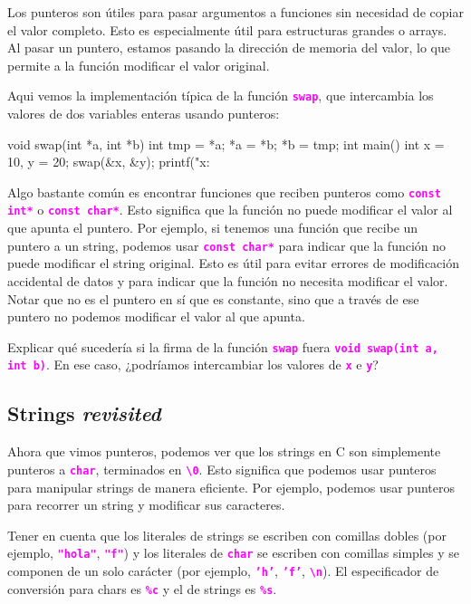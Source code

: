 \documentclass[]{scrartcl}
\newcommand{\hl}[1]{\textcolor{magenta}{\textbf{\texttt{#1}}}}
\begin{document}
Los punteros son útiles para pasar argumentos a funciones sin necesidad de copiar el valor completo. Esto es especialmente útil para estructuras grandes o arrays. Al pasar un puntero, estamos pasando la dirección de memoria del valor, lo que permite a la función modificar el valor original.

Aqui vemos la implementación típica de la función \hl{swap}, que intercambia los valores de dos variables enteras usando punteros:

\begin{cbox}[]{}

    void swap(int *a, int *b) {
        int tmp = *a;
        *a = *b;
        *b = tmp;
    }
    int main() {
        int x = 10, y = 20;
        swap(&x, &y);
        printf("x: %
    }
\end{cbox}

Algo bastante común es encontrar funciones que reciben punteros como \hl{const int*} o \hl{const char*}. Esto significa que la función no puede modificar el valor al que apunta el puntero. Por ejemplo, si tenemos una función que recibe un puntero a un string, podemos usar \hl{const char*} para indicar que la función no puede modificar el string original.
Esto es útil para evitar errores de modificación accidental de datos y para indicar que la función no necesita modificar el valor. Notar que no es el puntero en sí que es constante, sino que a través de ese puntero no podemos modificar el valor al que apunta. 

\begin{exbox}
Explicar qué sucedería si la firma de la función \hl{swap} fuera \hl{void swap(int a, int b)}. En ese caso, ¿podríamos intercambiar los valores de \hl{x} e \hl{y}? 
\end{exbox}

\subsection*{Strings \textit{revisited}}

Ahora que vimos punteros, podemos ver que los strings en C son simplemente punteros a \hl{char}, terminados en \hl{\textquotesingle\textbackslash0\textquotesingle}.
Esto significa que podemos usar punteros para manipular strings de manera eficiente. Por ejemplo, podemos usar punteros para recorrer un string y modificar sus caracteres.

Tener en cuenta que los literales de strings se escriben con comillas dobles (por ejemplo, \hl{"hola"}, \hl{"f"}) y los literales de \hl{char} se escriben con comillas simples y se componen de un solo carácter (por ejemplo, \hl{'h'}, \hl{'f'}, \hl{\textquotesingle\textbackslash n\textquotesingle}).
El especificador de conversión para chars es \hl{\%c} y el de strings es \hl{\%s}. 
\end{document}
